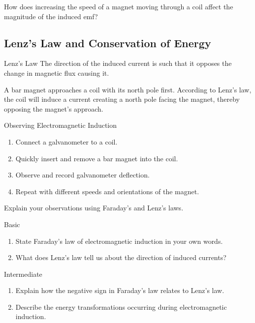 \begin{stopandthink}
How does increasing the speed of a magnet moving through a coil affect the magnitude of the induced emf?
\end{stopandthink}

\subsection{Lenz's Law and Conservation of Energy}
\FloatBarrier

\begin{keyconcept}{Lenz's Law}
The direction of the induced current is such that it opposes the change in magnetic flux causing it.
\end{keyconcept}


\begin{example}
A bar magnet approaches a coil with its north pole first. According to Lenz's law, the coil will induce a current creating a north pole facing the magnet, thereby opposing the magnet's approach.
\end{example}

\begin{investigation}{Observing Electromagnetic Induction}
\begin{enumerate}
    \item Connect a galvanometer to a coil.
    \item Quickly insert and remove a bar magnet into the coil.
    \item Observe and record galvanometer deflection.
    \item Repeat with different speeds and orientations of the magnet.
\end{enumerate}
Explain your observations using Faraday's and Lenz's laws.
\end{investigation}

\begin{tieredquestions}{Basic}
\begin{enumerate}
    \item State Faraday's law of electromagnetic induction in your own words.
    \item What does Lenz's law tell us about the direction of induced currents?
\end{enumerate}
\end{tieredquestions}

\begin{tieredquestions}{Intermediate}
\begin{enumerate}
    \item Explain how the negative sign in Faraday's law relates to Lenz's law.
    \item Describe the energy transformations occurring during electromagnetic induction.
\end{enumerate}
\end{tieredquestions}

